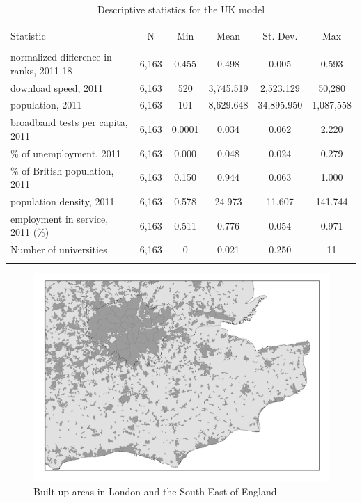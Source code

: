 \documentclass[10pt,letterpaper]{article}
\begin{document}
\begin{table}[!htbp] \centering 
  \caption{Descriptive statistics for the UK model\label{desc.uk}} 
  \label{} 
\small 
\begin{tabular}{@{\extracolsep{5pt}}lccccc} 
\\[-1.8ex]\hline 
\hline \\[-1.8ex] 
Statistic & \multicolumn{1}{c}{N} & \multicolumn{1}{c}{Min} & \multicolumn{1}{c}{Mean} & \multicolumn{1}{c}{St. Dev.} & \multicolumn{1}{c}{Max} \\ 
\hline \\[-1.8ex] 
normalized difference in ranks, 2011-18 & 6,163 & 0.455 & 0.498 & 0.005 & 0.593 \\ 
download speed, 2011 & 6,163 & 520 & 3,745.519 & 2,523.129 & 50,280 \\ 
population, 2011 & 6,163 & 101 & 8,629.648 & 34,895.950 & 1,087,558 \\ 
broadband tests per capita, 2011 & 6,163 & 0.0001 & 0.034 & 0.062 & 2.220 \\ 
\% of unemployment, 2011 & 6,163 & 0.000 & 0.048 & 0.024 & 0.279 \\ 
\% of British population, 2011 & 6,163 & 0.150 & 0.944 & 0.063 & 1.000 \\ 
population density, 2011 & 6,163 & 0.578 & 24.973 & 11.607 & 141.744 \\ 
employment in service, 2011 (\%) & 6,163 & 0.511 & 0.776 & 0.054 & 0.971 \\ 
Number of universities & 6,163 & 0 & 0.021 & 0.250 & 11 \\ 
\hline \\[-1.8ex] 
\end{tabular} 
\end{table}

\begin{figure}
\includegraphics[width=0.8\linewidth]{Figure1} \caption{\label{figure1}Built-up areas in London and the South East of England}\label{fig:unnamed-chunk-11}
\end{figure}
\end{document}
